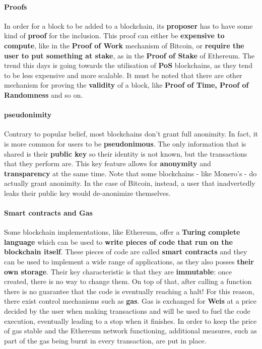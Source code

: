 \documentclass[12pt,a4paper,oneside]{article}
\theoremstyle{definition}
\begin{document}
\paragraph{Proofs} In order for a block to be added to a blockchain, its \textbf{proposer} has to have some kind of \textbf{proof} for the inclusion. This proof can either be \textbf{expensive to compute}, like in the \textbf{Proof of Work} mechanism of Bitcoin, or \textbf{require the user to put something at stake}, as in the \textbf{Proof of Stake} of Ethereum. The trend this days is going towards the utilisation of \textbf{PoS} blockchains, as they tend to be less expensive and more scalable. It must be noted that there are other mechanism for proving the \textbf{validity} of a block, like \textbf{Proof of Time, Proof of Randomness} and so on. \\

\paragraph{pseudonimity} Contrary to popular belief, most blockchains don't grant full anonimity. In fact, it is more common for users to be \textbf{pseudonimous}. The only information that is shared is their \textbf{public key} so their identity is not known, but the transactions that they perform are. This key feature allows for \textbf{anonymity} and \textbf{transparency} at the same time. Note that some blockchains - like Monero's - do actually grant anonimity. In the case of Bitcoin, instead, a user that inadvertedly leaks their public key would de-anonimize themselves.\\

\paragraph{Smart contracts and Gas} Some blockchain implementations, like Ethereum, offer a \textbf{Turing complete language} which can be used to \textbf{write pieces of code that run on the blockchain itself}. These pieces of code are called \textbf{smart contracts} and they can be used to implement a wide range of applications, as they also posses \textbf{their own storage}. Their key characteristic is that they are \textbf{immutable}: once created, there is no way to change them. On top of that, after calling a function there is no guarantee that the code is eventually reaching a halt! For this reason, there exist control mechanisms such as \textbf{gas}. Gas is exchanged for \textbf{Weis} at a price decided by the user when making  transactions and will be used to fuel the code execution, eventually leading to a stop when it finishes. In order to keep the price of gas stable and the Ethereum network functioning, additional measures, such as part of the gas being burnt in every transaction, are put in place. \\
\end{document}
